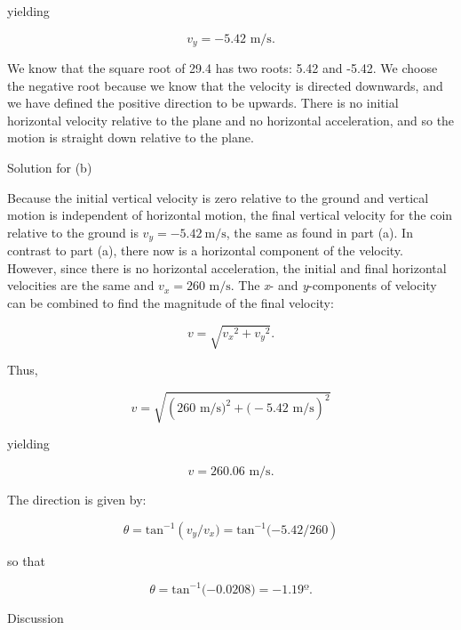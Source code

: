 \documentclass[
]{book}
\begin{document}
yielding

\leavevmode{}%
\[{{v_{y} = {- 5}}\text{.}\text{42\ m/s.}}{}\]

We know that the square root of 29.4 has two roots: 5.42 and -5.42. We
choose the negative root because we know that the velocity is directed
downwards, and we have defined the positive direction to be upwards.
There is no initial horizontal velocity relative to the plane and no
horizontal acceleration, and so the motion is straight down relative to
the plane.

{Solution for (b)}

Because the initial vertical velocity is zero relative to the ground and
vertical motion is independent of horizontal motion, the final vertical
velocity for the coin relative to the ground is
\(v_{y} = - 5.42\ \text{m/s}\), the same as found in part (a). In contrast
to part (a), there now is a horizontal component of the velocity.
However, since there is no horizontal acceleration, the initial and
final horizontal velocities are the same and
\({v_{x} = \text{260~m/s}}{}\). The \emph{x}- and \emph{y}-components of velocity
can be combined to find the magnitude of the final velocity:

\leavevmode{}%
\[{v = \sqrt{{v_{x}}^{2} + {v_{y}}^{2}}}\text{.}{}\]

Thus,

\leavevmode{}%
\[{v = \sqrt{(\text{260\ m/s}{{)^{2} + (} - 5}\text{.}\text{42\ m/s})^{2}}}{}\]

yielding

\leavevmode{}%
\[{{v = \text{260}}\text{.}\text{06\ m/s.}}{}\]

The direction is given by:

\leavevmode{}%
\[{{\theta = \text{tan}^{- 1}}({v_{y}/v_{x}}{) = \text{tan}^{- 1}}{( - 5}\text{.}{\text{42}/\text{260}})}{}\]

so that

\leavevmode{}%
\[{{\theta = \text{tan}^{- 1}}{( - 0}\text{.}\text{0208}{) = {- 1}}\text{.}\text{19º}}\text{.}\]

{Discussion}
\end{document}
